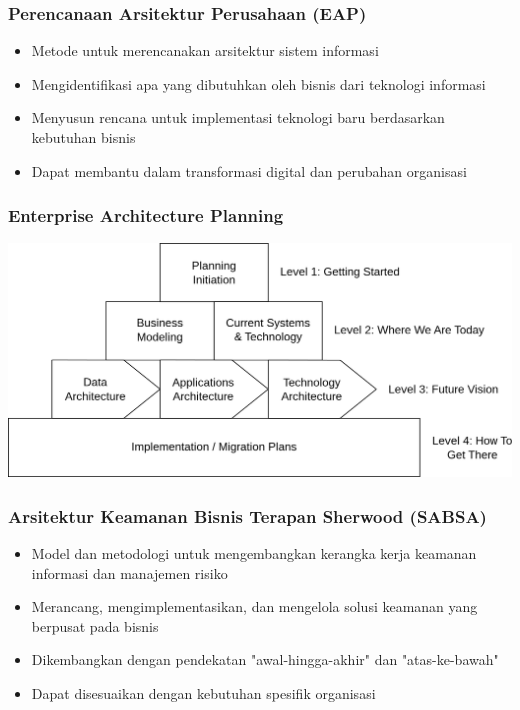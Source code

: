 \documentclass[aspectratio=169, table]{beamer}
\begin{document}
	\begin{frame}
		\frametitle{Perencanaan Arsitektur Perusahaan (EAP)}
		\begin{itemize}
			\item Metode untuk merencanakan arsitektur sistem informasi
			\item Mengidentifikasi apa yang dibutuhkan oleh bisnis dari teknologi informasi
			\item Menyusun rencana untuk implementasi teknologi baru berdasarkan kebutuhan bisnis
			\item Dapat membantu dalam transformasi digital dan perubahan organisasi
		\end{itemize}
	\end{frame}
	
	{
		\begin{frame}
			\frametitle{Enterprise Architecture Planning}
			\begin{center}
				\includegraphics[width=1\textwidth]{../figures/eap}
			\end{center}
		\end{frame}
	}
	
	\begin{frame}
		\frametitle{Arsitektur Keamanan Bisnis Terapan Sherwood (SABSA)}
		\begin{itemize}
			\item Model dan metodologi untuk mengembangkan kerangka kerja keamanan informasi dan manajemen risiko
			\item Merancang, mengimplementasikan, dan mengelola solusi keamanan yang berpusat pada bisnis
			\item Dikembangkan dengan pendekatan "awal-hingga-akhir" dan "atas-ke-bawah"
			\item Dapat disesuaikan dengan kebutuhan spesifik organisasi
		\end{itemize}
	\end{frame}
	
\end{document}
